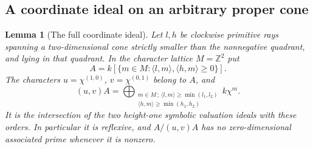 \documentclass[11pt,reqno]{amsart}
\numberwithin{equation}{section}
\newtheorem{lemma}[theorem]{Lemma}
\theoremstyle{definition}\newtheorem{definition}[theorem]{Definition}
\theoremstyle{remark}\newtheorem{remark}[theorem]{Remark}
\begin{document}
\subsection{A coordinate ideal on an arbitrary proper cone}
\begin{lemma}[The full coordinate ideal]
\label{lem:coordinate-ideal-v171}
Let $l,h$ be clockwise primitive rays spanning a two-dimensional
cone strictly smaller than the nonnegative quadrant, and lying in
that quadrant. In the character lattice $M=\mathbb Z^2$ put
\[
 A=k[\{m\in M:\langle l,m\rangle,\langle h,m\rangle\geq0\}].
\]
The characters $u=\chi^{(1,0)}$, $v=\chi^{(0,1)}$ belong to $A$, and
\begin{equation}\label{eq:coordinate-divisorial-v171}
 (u,v)A=\bigoplus_{\substack{m\in M\,;\,
 \langle l,m\rangle\geq\min(l_1,l_2)\\
 \langle h,m\rangle\geq\min(h_1,h_2)}} k\chi^m.
\end{equation}
It is the intersection of the two height-one symbolic valuation
ideals with these orders. In particular it is reflexive, and
$A/(u,v)A$ has no zero-dimensional associated prime whenever it is
nonzero.
\end{lemma}
\end{document}
